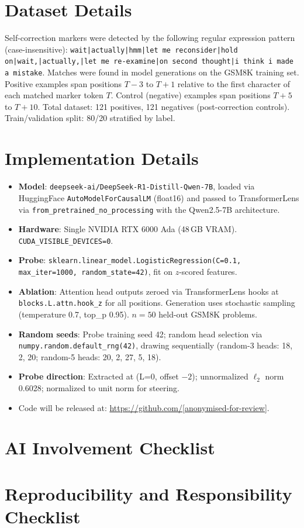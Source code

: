 \documentclass{article}
\begin{document}



\appendix

\section{Dataset Details}
\label{app:data}

Self-correction markers were detected by the following regular expression pattern (case-insensitive):
\texttt{wait|actually|hmm|let me reconsider|hold on|wait,|actually,|let me re-examine|on second thought|i think i made a mistake}.
Matches were found in model generations on the GSM8K training set.
Positive examples span positions $T - 3$ to $T + 1$ relative to the first character of each matched marker token $T$.
Control (negative) examples span positions $T + 5$ to $T + 10$.
Total dataset: 121 positives, 121 negatives (post-correction controls).
Train/validation split: 80/20 stratified by label.

\section{Implementation Details}
\label{app:impl}

\begin{itemize}
  \item \textbf{Model}: \texttt{deepseek-ai/DeepSeek-R1-Distill-Qwen-7B}, loaded via HuggingFace \texttt{AutoModelForCausalLM} (float16) and passed to TransformerLens via \texttt{from\_pretrained\_no\_processing} with the Qwen2.5-7B architecture.
  \item \textbf{Hardware}: Single NVIDIA RTX 6000 Ada (48\,GB VRAM). \texttt{CUDA\_VISIBLE\_DEVICES=0}.
  \item \textbf{Probe}: \texttt{sklearn.linear\_model.LogisticRegression(C=0.1, max\_iter=1000, random\_state=42)}, fit on $z$-scored features.
  \item \textbf{Ablation}: Attention head outputs zeroed via TransformerLens hooks at \texttt{blocks.L.attn.hook\_z} for all positions. Generation uses stochastic sampling (temperature 0.7, top\_p 0.95). $n = 50$ held-out GSM8K problems.
  \item \textbf{Random seeds}: Probe training seed 42; random head selection via \texttt{numpy.random.default\_rng(42)}, drawing sequentially (random-3 heads: 18, 2, 20; random-5 heads: 20, 2, 27, 5, 18).
  \item \textbf{Probe direction}: Extracted at (L=0, offset $-2$); unnormalized $\ell_2$ norm 0.6028; normalized to unit norm for steering.
  \item Code will be released at: \url{https://github.com/[anonymised-for-review]}.
\end{itemize}

\section{AI Involvement Checklist}
\label{app:ai}


\section{Reproducibility and Responsibility Checklist}
\label{app:repro}

\end{document}
